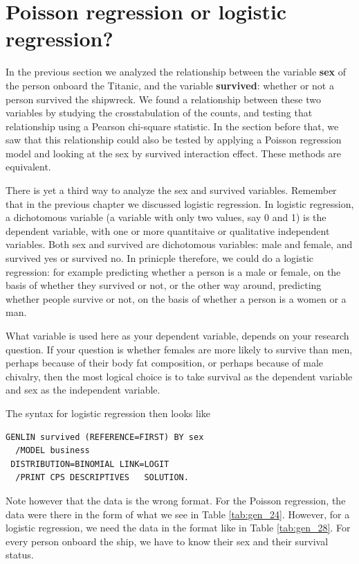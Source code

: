 \documentclass[]{book}\usepackage[]{graphicx}\usepackage[]{color}
\begin{document}
\section{Poisson regression or logistic regression?}


In the previous section we analyzed the relationship between the variable \textbf{sex} of the person onboard the Titanic, and the variable \textbf{survived}: whether or not a person survived the shipwreck. We found a relationship between these two variables by studying the crosstabulation of the counts, and testing that relationship using a Pearson chi-square statistic. In the section before that, we saw that this relationship could also be tested by applying a Poisson regression model and looking at the sex by survived interaction effect. These methods are equivalent.

There is yet a third way to analyze the sex and survived variables. Remember that in the previous chapter we discussed logistic regression. In logistic regression, a dichotomous variable (a variable with only two values, say 0 and 1) is the dependent variable, with one or more quantitaive or qualitative independent variables. Both sex and survived are dichotomous variables: male and female, and survived yes or survived no. In prinicple therefore, we could do a logistic regression: for example predicting whether a person is a male or female, on the basis of whether they survived or not, or the other way around, predicting whether people survive or not, on the basis of whether a person is a women or a man.


What variable is used here as your dependent variable, depends on your research question. If your question is whether females are more likely to survive than men, perhaps because of their body fat composition, or perhaps because of male chivalry, then the most logical choice is to take survival as the dependent variable and sex as the independent variable.

The syntax for logistic regression then looks like

\begin{verbatim}
GENLIN survived (REFERENCE=FIRST) BY sex
  /MODEL business
 DISTRIBUTION=BINOMIAL LINK=LOGIT
  /PRINT CPS DESCRIPTIVES   SOLUTION.
\end{verbatim}


Note however that the data is the wrong format. For the Poisson regression, the data were there in the form of what we see in Table \ref{tab:gen_24}. However, for a logistic regression, we need the data in the format like in Table \ref{tab:gen_28}. For every person onboard the ship, we have to know their sex and their survival status.
\end{document}

